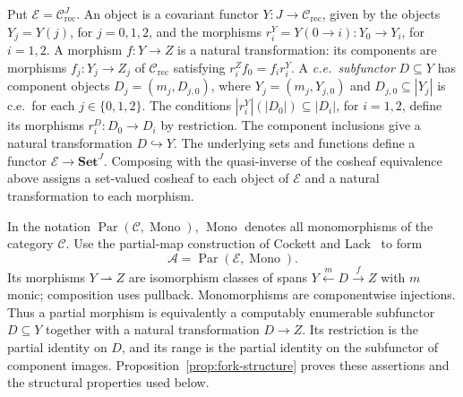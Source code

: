 Put $\mathcal E=\mathcal C_{\mathrm{rec}}^J$.
An object is a covariant functor $Y:J\to\mathcal C_{\mathrm{rec}}$,
given by the objects $Y_j=Y(j)$, for $j=0,1,2$, and the
morphisms $r_i^Y=Y(0\to i):Y_0\to Y_i$, for $i=1,2$.
A morphism $f:Y\to Z$ is a natural transformation: its components
are morphisms $f_j:Y_j\to Z_j$ of $\mathcal C_{\mathrm{rec}}$ satisfying
$r_i^Zf_0=f_i r_i^Y$.
A \emph{c.e.\ subfunctor} $D\subseteq Y$ has component objects
$D_j=(m_j,D_{j,0})$, where $Y_j=(m_j,Y_{j,0})$ and
$D_{j,0}\subseteq|Y_j|$ is c.e.\ for each $j\in\{0,1,2\}$.
The conditions $|r_i^Y|(|D_0|)\subseteq|D_i|$, for $i=1,2$,
define its morphisms $r_i^D:D_0\to D_i$ by restriction.
The component inclusions give a natural transformation $D\hookrightarrow Y$.
The underlying sets and functions define a functor
$\mathcal E\to\mathbf{Set}^J$. Composing with the quasi-inverse of
the cosheaf equivalence above assigns a set-valued cosheaf to each
object of $\mathcal E$ and a natural transformation to each morphism.

In the notation $\operatorname{Par}(\mathcal C,\operatorname{Mono})$,
$\operatorname{Mono}$ denotes all monomorphisms of the category
$\mathcal C$. Use the partial-map construction of Cockett and
Lack~\cite[Section~3]{CockettLack} to form
\[
 \mathcal A=\operatorname{Par}(\mathcal E,\operatorname{Mono}).
\]
Its morphisms $Y\rightharpoonup Z$ are isomorphism classes of spans
$Y\xleftarrow{m}D\xrightarrow{f}Z$ with $m$ monic; composition
uses pullback. Monomorphisms are componentwise injections.
Thus a partial morphism is equivalently a computably enumerable
subfunctor $D\subseteq Y$ together with a natural transformation
$D\to Z$. Its restriction is the partial identity on $D$, and its range is the
partial identity on the subfunctor of component images.
Proposition~\ref{prop:fork-structure} proves these assertions and
the structural properties used below.

